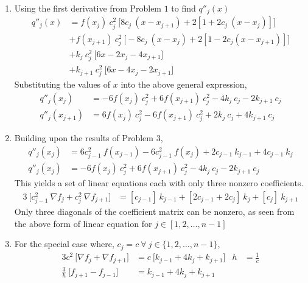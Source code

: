 \begin{enumerate}
    \item Using the first derivative from Problem $ 1 $ to find $ q''_j(x) $
          \begin{align}
              q''_j(x) & = f(x_j)\ c_j^2\ \Big[ 8c_j\ (x - x_{j+1}) +
              2[1 +  2c_j\ (x - x_j)] \Big]                                 \\
                       & + f(x_{j+1})\ c_j^2\ \Big[ -8c_j\ (x - x_j)
              + 2[1 - 2c_j(x - x_{j+1})] \Big]                              \\
                       & + k_j\ c_j^2\ \Big[ 6x - 2x_j - 4x_{j+1} \Big]     \\
                       & + k_{j+1}\ c_j^2\ \Big[ 6x - 4x_j - 2x_{j+1} \Big]
          \end{align}
          Substituting the values of $ x $ into the above general expression,
          \begin{align}
              q''_j(x_j)     & = -6f(x_j)\ c_j^2 + 6f(x_{j+1})\ c_j^2 - 4k_j\ c_j
              - 2k_{j+1}\ c_j                                                     \\
              q''_j(x_{j+1}) & = 6f(x_j)\ c_j^2 - 6f(x_{j+1})\ c_j^2 + 2k_j\ c_j
              + 4k_{j+1}\ c_j
          \end{align}

    \item Building upon the results of Problem $ 3 $,
          \begin{align}
              q''_j(x_j) & = 6c_{j-1}^2\ f(x_{j-1}) - 6c_{j-1}^2\ f(x_j)
              + 2c_{j-1}\ k_{j-1} + 4c_{j-1}\ k_j                             \\
              q''_j(x_j) & = -6f(x_j)\ c_j^2 + 6f(x_{j+1})\ c_j^2 - 4k_j\ c_j
              - 2k_{j+1}\ c_j
          \end{align}
          This yields a set of linear equations each with only three nonzero
          coefficients.
          \begin{align}
              3\ \Big[ c_{j-1}^2\ \nabla f_{j} + c_j^2\ \nabla f_{j+1} \Big]
               & = [c_{j-1}]\ k_{j-1} + [2c_{j-1} + 2c_j]\ k_j
              + [c_j]\ k_{j+1}
          \end{align}
          Only three diagonals of the coefficient matrix can be nonzero, as seen from
          the above form of linear equation for $ j \in [1,2,\dots,n-1] $

    \item For the special case where, $ c_j = c\ \forall\ j \in \{1,2,\dots,n-1\} $,
          \begin{align}
              3c^2\ \Big[\nabla f_j + \nabla f_{j+1}\Big] & = c\ \Big[k_{j-1}
              + 4k_j + k_{j+1}\Big]                       &
              h                                           & = \frac{1}{c}     \\
              \frac{3}{h}\ \Big[ f_{j+1} - f_{j-1} \Big]  & =
              k_{j-1} + 4k_j + k_{j+1}
          \end{align}


\end{enumerate}
